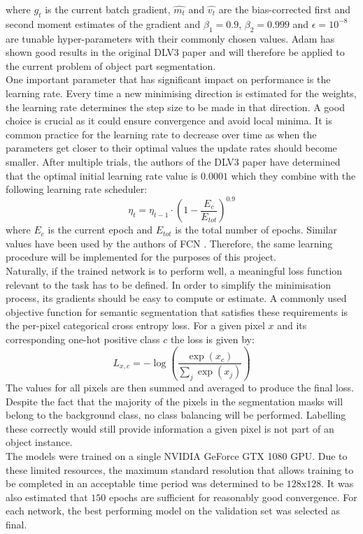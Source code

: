 \documentclass[main.tex]{subfiles}
\begin{document}
where $g_t$ is the current batch gradient, $\hat{m_t}$ and $\hat{v_t}$ are the bias-corrected first and second moment estimates of the gradient and $\beta_1=0.9$, $\beta_2=0.999$ and $\epsilon=10^{-8}$ are tunable hyper-parameters with their commonly chosen values. Adam has shown good results in the original DLV3 paper \cite{Chen2017} and will therefore be applied to the current problem of object part segmentation. \\ 
\indent One important parameter that has significant impact on performance is the learning rate. Every time a new minimising direction is estimated for the weights, the learning rate determines the step size to be made in that direction. A good choice is crucial as it could ensure convergence and avoid local minima. It is common practice for the learning rate to decrease over time as when the parameters get closer to their optimal values the update rates should become smaller. After multiple trials, the authors of the DLV3 paper \cite{Chen2017} have determined that the optimal initial learning rate value is $0.0001$ which they combine with the following learning rate scheduler: 
\begin{equation}
\eta_{t} = \eta_{t-1} \cdot (1 - \frac{E_c}{E_{tot}})^{0.9}
\end{equation}
where $E_c$ is the current epoch and $E_{tot}$ is the total number of epochs. Similar values have been used by the authors of FCN \cite{Shelhamer2016}. Therefore, the same learning procedure will be implemented for the purposes of this project.\\
\indent Naturally, if the trained network is to perform well, a meaningful loss function relevant to the task has to be defined. In order to simplify the minimisation process, its gradients should be easy to compute or estimate. A commonly used objective function for semantic segmentation that satisfies these requirements is the per-pixel categorical cross entropy loss. For a given pixel $x$ and its corresponding one-hot positive class $c$ the loss is given by:
\begin{equation}
L_{x, c} = -\log\left(\frac{\exp(x_c)}{\sum_j \exp(x_j)}\right)
\end{equation}
\indent The values for all pixels are then summed and averaged to produce the final loss. Despite the fact that the majority of the pixels in the segmentation masks will belong to the background class, no class balancing will be performed. Labelling these correctly would still provide information a given pixel is not part of an object instance.\\
\indent The models were trained on a single NVIDIA GeForce GTX 1080 GPU. Due to these limited resources, the maximum standard resolution that allows training to be completed in an acceptable time period was determined to be $128$x$128$. It was also estimated that $150$ epochs are sufficient for reasonably good convergence. For each network, the best performing model on the validation set was selected as final.
\end{document}
